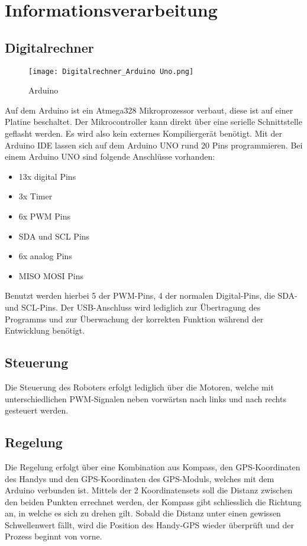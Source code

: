 \section{Informationsverarbeitung}

\subsection{Digitalrechner}
\begin{figure}[H]
    \begin{center}
    \texttt{[image: Digitalrechner\_Arduino Uno.png]}
    \end{center}
    \caption{Arduino}
\end{figure}

Auf dem Arduino ist ein Atmega328 Mikroprozessor verbaut, diese ist auf einer Platine beschaltet. Der Mikrocontroller kann direkt über eine serielle Schnittstelle geflasht werden. Es wird also kein externes Kompiliergerät benötigt. Mit der Arduino IDE lassen sich auf dem Arduino UNO rund 20 Pins programmieren. Bei einem Arduino UNO sind folgende Anschlüsse vorhanden: 

\begin{itemize}
    \item 13x digital Pins 
    \item 3x Timer 
    \item 6x PWM Pins 
    \item SDA und SCL Pins 
    \item 6x analog Pins 
    \item MISO MOSI Pins
\end{itemize}

Benutzt werden hierbei 5 der PWM-Pins, 4 der normalen Digital-Pins, die SDA- und SCL-Pins. Der USB-Anschluss wird lediglich zur Übertragung des Programms und zur Überwachung der korrekten Funktion während der Entwicklung benötigt.


\subsection{Steuerung}
Die Steuerung des Roboters erfolgt lediglich über die Motoren, welche mit unterschiedlichen PWM-Signalen neben vorwärtsn nach links und nach rechts gesteuert werden. 

\subsection{Regelung}
Die Regelung erfolgt über eine Kombination aus Kompass, den GPS-Koordinaten des Handys und den GPS-Koordinaten des GPS-Moduls, welches mit dem Arduino verbunden ist. Mittels der 2 Koordinatensets soll die Distanz zwischen den beiden Punkten errechnet werden, der Kompass gibt schliesslich die Richtung an, in welche es sich zu drehen gilt. Sobald die Distanz unter einen gewissen Schwellenwert fällt, wird die Position des Handy-GPS wieder überprüft und der Prozess beginnt von vorne.
